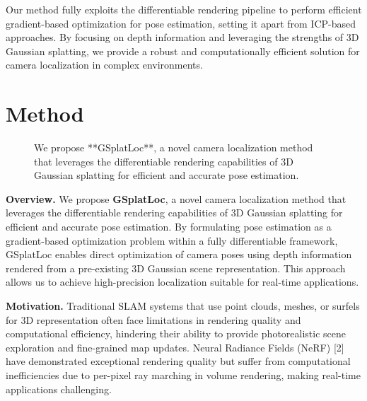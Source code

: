 \documentclass[twocolumn]{article} %
\begin{document}
Our method fully exploits the differentiable rendering pipeline to
perform efficient gradient-based optimization for pose estimation,
setting it apart from ICP-based approaches. By focusing on depth
information and leveraging the strengths of 3D Gaussian splatting, we
provide a robust and computationally efficient solution for camera
localization in complex environments.

\section{Method}\label{method}

\begin{figure}[!t]
\vspace{-2cm}
\centering
{}
\caption{We propose **GSplatLoc**, a novel camera localization method that leverages the differentiable rendering capabilities of 3D Gaussian splatting for efficient and accurate pose estimation.}
\label{fig:cross-column-image}
\end{figure}

\textbf{Overview.} We propose \textbf{GSplatLoc}, a novel camera
localization method that leverages the differentiable rendering
capabilities of 3D Gaussian splatting for efficient and accurate pose
estimation. By formulating pose estimation as a gradient-based
optimization problem within a fully differentiable framework, GSplatLoc
enables direct optimization of camera poses using depth information
rendered from a pre-existing 3D Gaussian scene representation. This
approach allows us to achieve high-precision localization suitable for
real-time applications.

\textbf{Motivation.} Traditional SLAM systems that use point clouds,
meshes, or surfels for 3D representation often face limitations in
rendering quality and computational efficiency, hindering their ability
to provide photorealistic scene exploration and fine-grained map
updates. Neural Radiance Fields (NeRF) {[}2{]} have demonstrated
exceptional rendering quality but suffer from computational
inefficiencies due to per-pixel ray marching in volume rendering, making
real-time applications challenging.
\end{document}
